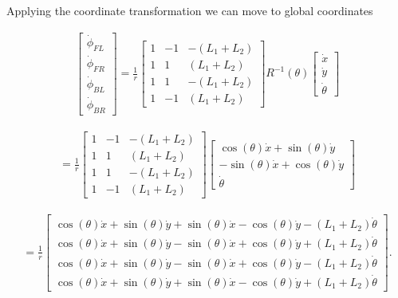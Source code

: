 Applying the coordinate transformation we can move to global coordinates

\[\begin{aligned}
\begin{bmatrix}\dot{\phi}_{FL} \\[3mm] \dot{\phi}_{FR} \\[3mm] \dot{\phi}_{BL} \\[3mm] \dot{\phi}_{BR} \end{bmatrix}
=
\frac{1}{ r}
\begin{bmatrix} 1 & -1 & -(L_1+L_2)  \\[3mm]
                1 & 1 & (L_1+L_2)  \\[3mm]
                1 & 1 & -(L_1+L_2)  \\[3mm]
                1 & -1 & (L_1+L_2)
 \end{bmatrix}
 R^{-1}(\theta)
\begin{bmatrix}\dot{x} \\[3mm] \dot{y} \\[3mm] \dot{\theta} \end{bmatrix}
\end{aligned}\]

\[\begin{aligned}
=
\frac{1}{ r}
\begin{bmatrix} 1 & -1 & -(L_1+L_2)  \\[3mm]
                1 & 1 & (L_1+L_2)  \\[3mm]
                1 & 1 & -(L_1+L_2)  \\[3mm]
                1 & -1 & (L_1+L_2)
\end{bmatrix}
\begin{bmatrix}\cos(\theta) \dot{x} + \sin(\theta)\dot{y}\\[3mm] -\sin(\theta)\dot{x} + \cos(\theta)\dot{y} \\[3mm] \dot{\theta} \end{bmatrix}
\end{aligned}\]

\[\begin{aligned}
=
\frac{1}{ r}
\begin{bmatrix}  \cos(\theta) \dot{x} + \sin(\theta)\dot{y} + \sin(\theta)\dot{x} - \cos(\theta)\dot{y} -(L_1+L_2)\dot{\theta}  \\[3mm]
                  \cos(\theta) \dot{x} + \sin(\theta)\dot{y} - \sin(\theta)\dot{x} + \cos(\theta)\dot{y} +(L_1+L_2)\dot{\theta}  \\[3mm]
                  \cos(\theta) \dot{x} + \sin(\theta)\dot{y} - \sin(\theta)\dot{x} + \cos(\theta)\dot{y} -(L_1+L_2)\dot{\theta}   \\[3mm]
                 \cos(\theta) \dot{x} + \sin(\theta)\dot{y} + \sin(\theta)\dot{x} - \cos(\theta)\dot{y} +(L_1+L_2)\dot{\theta}
\end{bmatrix} .
\end{aligned}\]

